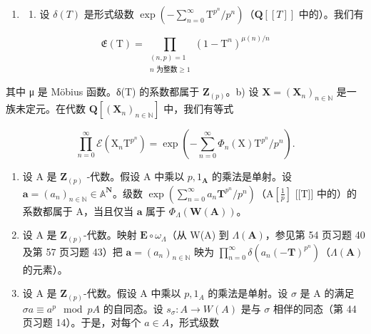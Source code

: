 \begin{enumerate}
\def\labelenumi{\arabic{enumi})}
\setcounter{enumi}{57}
\tightlist
\item
  \begin{enumerate}
  \def\labelenumii{\alph{enumii})}
  \tightlist
  \item
    设 \(\delta(T)\) 是形式级数 \(\exp\left(-\sum_{n=0}^{\infty}\mathrm{T}^{p^n}/p^n\right)\)（\(\mathbf{Q}[[T]]\) 中的）。我们有
  \end{enumerate}
\end{enumerate}

\[
\mathfrak{E}(\mathrm{T}) = \prod_{\substack{(n,p) = 1\\ n\text{ 为整数}\geqslant 1}}(1 - \mathrm{T}^{n})^{\mu (n) / n}
\]

其中 μ 是 Möbius 函数。δ(T) 的系数都属于 \(\mathbf{Z}_{(p)}\)。b) 设 \(\mathbf{X} = (\mathbf{X}_{n})_{n \in \mathbb{N}}\) 是一族未定元。在代数 \(\mathbf{Q}[(\mathbf{X}_{n})_{n \in \mathbb{N}}]\) 中，我们有等式

\[
\prod_ {n = 0} ^ {\infty} \mathcal {E} (\mathrm{X} _ {n} \mathrm{T} ^ {p ^ {n}}) = \exp \left(- \sum_ {n = 0} ^ {\infty} \Phi_ {n} (\mathrm{X}) \mathrm{T} ^ {p ^ {n}} / p ^ {n}\right).
\]

\begin{enumerate}
\def\labelenumi{\alph{enumi})}
\setcounter{enumi}{2}
\item
  设 A 是 \(\mathbf{Z}_{(p)}\) -代数。假设 A 中乘以 \(p, 1_{\mathbf{A}}\) 的乘法是单射。设 \(\boldsymbol{a} = (a_n)_{n \in \mathbb{N}} \in \mathbb{A}^{\mathbf{N}}\)。级数 \(\exp\left(\sum_{n=0}^{\infty} a_n \mathbf{T}^{p^n} / p^n\right)\)（\(\mathrm{A}\left[\frac{1}{p}\right]\) {[}{[}T{]}{]} 中的）的系数都属于 A，当且仅当 \(\boldsymbol{a}\) 属于 \(\Phi_{\Lambda}(\mathbf{W}(\mathbf{A}))\)。
\item
  设 A 是 \(\mathbf{Z}_{(p)}\)-代数。映射 \(\mathbf{E} \circ \omega_{\Lambda}\)（从 W(A) 到 \(\Lambda(\mathbf{A})\)，参见第 54 页习题 40 及第 57 页习题 43）把 \(\boldsymbol{a} = (a_n)_{n \in \mathbb{N}}\) 映为 \(\prod_{n=0}^{\infty} \delta(a_n(-\mathbf{T})^{p^n})\)（\(\Lambda(\mathbf{A})\) 的元素）。
\item
  设 A 是 \(\mathbf{Z}_{(p)}\)-代数。假设 A 中乘以 \(p,1_{A}\) 的乘法是单射。设 \(\sigma\) 是 A 的满足 \(\sigma a \equiv a^{p} \mod pA\) 的自同态。设 \(s_{\sigma}:A \to W(A)\) 是与 \(\sigma\) 相伴的同态（第 44 页习题 14）。于是，对每个 \(a \in A\)，形式级数
\end{enumerate}

